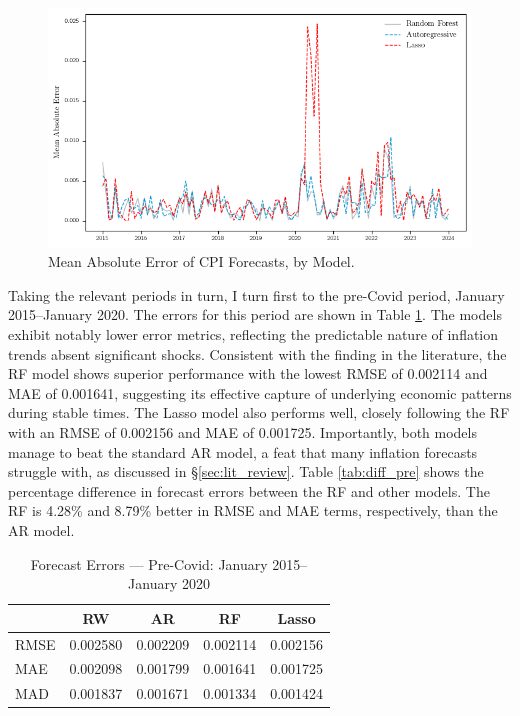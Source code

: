 \begin{figure}[H]
    \centering
    \includegraphics[width=1\linewidth]{figures/errors.png}
    \vspace{-30pt}
    \caption{Mean Absolute Error of CPI Forecasts, by Model.}
    \label{fig:errors} 
\end{figure}


Taking the relevant periods in turn, I turn first to the pre-Covid period, January 2015–January 2020. The errors for this period are shown in Table \ref{tab:errors_pre}. The models exhibit notably lower error metrics, reflecting the predictable nature of inflation trends absent significant shocks. Consistent with the finding in the literature, the RF model shows superior performance with the lowest RMSE of 0.002114 and MAE of 0.001641, suggesting its effective capture of underlying economic patterns during stable times. The Lasso model also performs well, closely following the RF with an RMSE of 0.002156 and MAE of 0.001725. Importantly, both models manage to beat the standard AR model, a feat that many inflation forecasts struggle with, as discussed in \S \ref{sec:lit_review}. Table \ref{tab:diff_pre} shows the percentage difference in forecast errors between the RF and other models. The RF is 4.28\% and 8.79\% better in RMSE and MAE terms, respectively, than the AR model. 



\begin{table}[H]
\centering
\caption{Forecast Errors — Pre-Covid: January 2015–January 2020} \label{tab:errors_pre}
\begin{tabular}{lcccc}
\toprule
& RW & AR & RF & Lasso \\
\midrule
RMSE & 0.002580 & 0.002209 & 0.002114 & 0.002156 \\
MAE  & 0.002098 & 0.001799 & 0.001641 & 0.001725 \\
MAD  & 0.001837 & 0.001671 & 0.001334 & 0.001424 \\
\bottomrule
\end{tabular}
\end{table}


